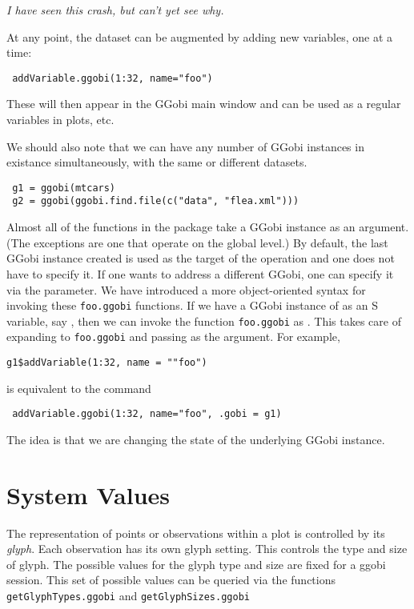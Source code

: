 \documentclass{article}
\def\SFunction#1{{\texttt{\red #1}}}
\def\note#1{\textsl{\red #1}}
\begin{document}
\note{I have seen this crash, but can't yet see why.}


At any point, the dataset can be augmented by adding new variables,
one at a time:
\begin{verbatim}
 addVariable.ggobi(1:32, name="foo")
\end{verbatim}
These will then appear in the GGobi main window
and can be used as a regular variables in
plots, etc.


We should also note that we can have any number of GGobi instances in
existance simultaneously, with the same or different datasets.
\begin{verbatim}
 g1 = ggobi(mtcars)
 g2 = ggobi(ggobi.find.file(c("data", "flea.xml")))
\end{verbatim}

Almost all of the functions in the  package take a
GGobi instance as an argument.  (The exceptions are one that operate
on the global level.)  By default, the last GGobi instance created is
used as the target of the operation and one does not have to specify
it.  If one wants to address a different GGobi, one can specify it via
the  parameter.
We have introduced a more object-oriented syntax for
invoking these \SFunction{foo.ggobi} functions.
If we have a GGobi instance of as an S variable, say ,
then we can invoke the function
\SFunction{foo.ggobi} as .
This takes care of expanding to \SFunction{foo.ggobi}
and passing  as the  argument.
For example, 
\begin{verbatim}
g1$addVariable(1:32, name = ""foo")
\end{verbatim}
is equivalent to the command
\begin{verbatim}
 addVariable.ggobi(1:32, name="foo", .gobi = g1)
\end{verbatim}
The idea is that we are changing the state of the underlying 
GGobi instance.




\section{System Values}
The representation of points or observations within a plot is
controlled by its \textit{glyph}.  Each observation has its own glyph
setting. This controls the type and size of glyph.
The possible values for the glyph type and size
are fixed for a ggobi session.
This set of possible values can be queried via the functions
\SFunction{getGlyphTypes.ggobi}
and 
\SFunction{getGlyphSizes.ggobi}
\end{document}
